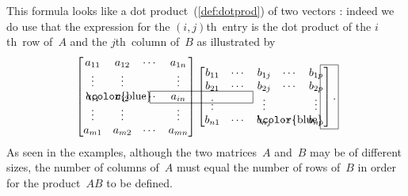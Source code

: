This formula looks like a dot product~(\autoref{def:dotprod}) of two vectors : indeed we do use that the expression for the \((i,j)\)th~entry is the dot product of the \(i\)th~row of~\(A\) and the \(j\)th~column of~\(B\) as illustrated by
\begin{equation*}
\begin{bmatrix} a_{11}&a_{12}&\cdots&a_{1n}
\\\vdots&\vdots&&\vdots
\\\rlap{\color{blue}\hspace{-0.2em}\framebox{\phantom{\rule{8.7em}{1ex}}}}
a_{i1}&a_{i2}&\cdots&a_{in}
\\\vdots&\vdots&&\vdots
\\a_{m1}&a_{m2}&\cdots&a_{mn} \end{bmatrix}
\begin{bmatrix} b_{11}&\cdots&b_{1j}&\cdots&b_{1p}
\\b_{21}&\cdots&b_{2j}&\cdots&b_{2p}
\\\vdots&&\vdots&&\vdots
\\b_{n1}&\cdots&
\rlap{\color{blue}\hspace{-0.25em}\smash{\framebox{\phantom{\rule[-0.5ex]{1em}{12ex}}}}}
b_{nj}&\cdots&b_{np} \end{bmatrix}.
\end{equation*}
As seen in the examples, although the two matrices~\(A\) and~\(B\) may be of different sizes, the number of columns of~\(A\) must equal the number of rows of~\(B\) in order for the product~\(AB\) to be defined.




